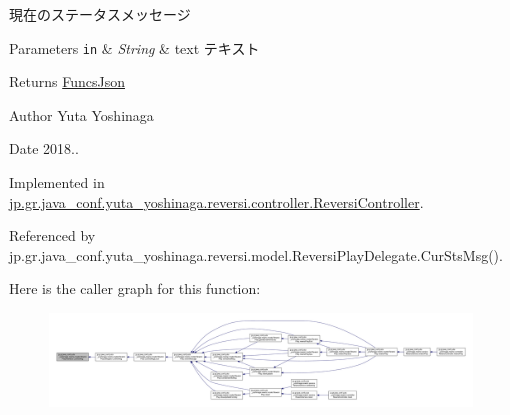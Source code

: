 現在のステータスメッセージ 


\begin{DoxyParams}[1]{Parameters}
\mbox{\tt in}  & {\em String} & text テキスト \\
\hline
\end{DoxyParams}
\begin{DoxyReturn}{Returns}
\hyperlink{classjp_1_1gr_1_1java__conf_1_1yuta__yoshinaga_1_1reversi_1_1model_1_1_funcs_json}{Funcs\+Json} 
\end{DoxyReturn}
\begin{DoxyAuthor}{Author}
Yuta Yoshinaga 
\end{DoxyAuthor}
\begin{DoxyDate}{Date}
2018.. 
\end{DoxyDate}


Implemented in \hyperlink{classjp_1_1gr_1_1java__conf_1_1yuta__yoshinaga_1_1reversi_1_1controller_1_1_reversi_controller_a54cfbfa89d25bb2db441473ba53a5140}{jp.\+gr.\+java\+\_\+conf.\+yuta\+\_\+yoshinaga.\+reversi.\+controller.\+Reversi\+Controller}.



Referenced by jp.\+gr.\+java\+\_\+conf.\+yuta\+\_\+yoshinaga.\+reversi.\+model.\+Reversi\+Play\+Delegate.\+Cur\+Sts\+Msg().

Here is the caller graph for this function\+:
\nopagebreak
\begin{figure}[H]
\begin{center}
\leavevmode
\includegraphics[width=350pt]{interfacejp_1_1gr_1_1java__conf_1_1yuta__yoshinaga_1_1reversi_1_1model_1_1_reversi_play_interface_ae9fe1e8ed6fca483d91b4647d8c86a83_icgraph}
\end{center}
\end{figure}
\mbox{\label{interfacejp_1_1gr_1_1java__conf_1_1yuta__yoshinaga_1_1reversi_1_1model_1_1_reversi_play_interface_a21001830e58b302934372c19cd261f95}} 
